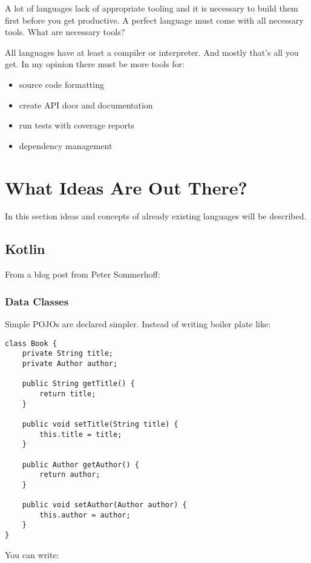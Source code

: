 \documentclass[a4paper,12pt]{article}
\begin{document}
A lot of languages lack of appropriate tooling and it is necessary to build them first before you get productive. A perfect language must come with all necessary tools. What are necessary tools?

All languages have at least a compiler or interpreter. And mostly that's all you get. In my opinion there must be more tools for:

\begin{itemize}
    \item source code formatting
    \item create API docs and documentation
    \item run tests with coverage reports
    \item dependency management
\end{itemize}

\section{What Ideas Are Out There?}

In this section ideas and concepts of already existing languages will be described.

\subsection{Kotlin}

From a blog post from Peter Sommerhoff\cite{kotlin-sommerhoff}:

\subsubsection{Data Classes}

Simple POJOs are declared simpler. Instead of writing boiler plate like:

\begin{verbatim}
class Book {
    private String title;
    private Author author;

    public String getTitle() {
        return title;
    }
    
    public void setTitle(String title) {
        this.title = title;
    }

    public Author getAuthor() {
        return author;
    }
    
    public void setAuthor(Author author) {
        this.author = author;
    }
}
\end{verbatim}

You can write:
\end{document}
